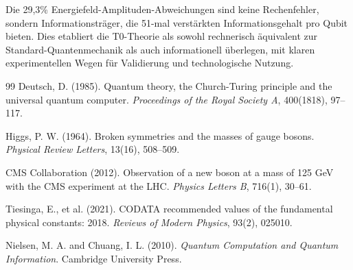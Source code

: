 	Die 29,3\% Energiefeld-Amplituden-Abweichungen sind keine Rechenfehler, sondern Informationsträger, die 51-mal verstärkten Informationsgehalt pro Qubit bieten. Dies etabliert die T0-Theorie als sowohl rechnerisch äquivalent zur Standard-Quantenmechanik als auch informationell überlegen, mit klaren experimentellen Wegen für Validierung und technologische Nutzung.
	
	\begin{thebibliography}{99}
		Deutsch, D. (1985). Quantum theory, the Church-Turing principle and the universal quantum computer. \textit{Proceedings of the Royal Society A}, 400(1818), 97--117.
		
		Higgs, P. W. (1964). Broken symmetries and the masses of gauge bosons. \textit{Physical Review Letters}, 13(16), 508--509.
		
		CMS Collaboration (2012). Observation of a new boson at a mass of 125 GeV with the CMS experiment at the LHC. \textit{Physics Letters B}, 716(1), 30--61.
		
		Tiesinga, E., et al. (2021). CODATA recommended values of the fundamental physical constants: 2018. \textit{Reviews of Modern Physics}, 93(2), 025010.
		
		Nielsen, M. A. and Chuang, I. L. (2010). \textit{Quantum Computation and Quantum Information}. Cambridge University Press.
	\end{thebibliography}
	